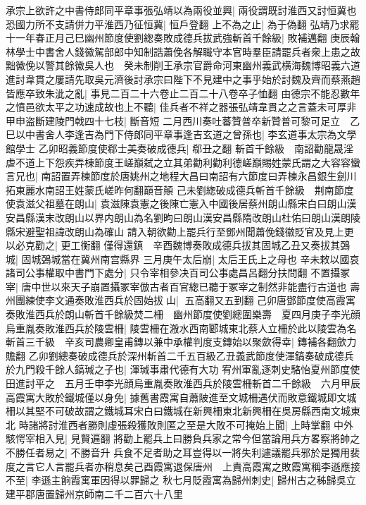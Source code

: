 承宗上欲許之中書侍郎同平章事張弘靖以為兩役並興|{
	兩役謂既討淮西又討恒冀也}
恐國力所不支請併力平淮西乃征恒冀|{
	恒戶登翻}
上不為之止|{
	為于偽翻}
弘靖乃求罷　十一年春正月己巳幽州節度使劉緫奏敗成德兵拔武強斬首千餘級|{
	敗補邁翻}
庚辰翰林學士中書舍人錢徽駕部郎中知制誥蕭俛各解職守本官時羣臣請罷兵者衆上患之故黜徽俛以警其餘徽吳人也　癸未制削王承宗官爵命河東幽州義武横海魏博昭義六道進討韋貫之屢請先取吳元濟後討承宗曰陛下不見建中之事乎始於討魏及齊而蔡燕趙皆應卒致朱泚之亂|{
	事見二百二十六卷止二百二十八卷卒子恤翻}
由德宗不能忍數年之憤邑欲太平之功速成故也上不聽|{
	佳兵者不祥之器張弘靖韋貫之之言蓋未可厚非}
甲申盗斷建陵門戟四十七枝|{
	斷音短}
二月西川奏吐蕃贊普卒新贊普可黎可足立　乙巳以中書舍人李逢吉為門下侍郎同平章事逢吉玄道之曾孫也|{
	李玄道事太宗為文學館學士}
乙卯昭義節度使郗士美奏破成德兵|{
	郗丑之翻}
斬首千餘級　南詔勸龍晟淫虐不道上下怨疾弄棟節度王嵯巔弑之立其弟勸利勸利德嵯巔賜姓蒙氏謂之大容容蠻言兄也|{
	南詔置弄棟節度於唐姚州之地程大昌曰南詔有六節度曰弄棟永昌銀生劍川拓東麗水南詔王姓蒙氏嵯昨何翻巔音顛}
己未劉緫破成德兵斬首千餘級　荆南節度使袁滋父祖墓在朗山|{
	袁滋陳袁憲之後陳亡憲入中國後居蔡州朗山縣宋白曰朗山漢安昌縣漢末改朗山以界内朗山為名劉昫曰朗山漢安昌縣隋改朗山杜佑曰朗山漢朗陵縣宋避聖祖諱改朗山為確山}
請入朝欲勸上罷兵行至鄧州聞蕭俛錢徽貶官及見上更以必克勸之|{
	更工衡翻}
僅得還鎮　辛酉魏博奏敗成德兵拔其固城乙丑又奏拔其鵶城|{
	固城鵶城當在冀州南宫縣界}
三月庚午太后崩|{
	太后王氏上之母也}
辛未敕以國哀諸司公事權取中書門下處分|{
	只令宰相參决百司公事處昌呂翻分扶問翻}
不置攝冢宰|{
	唐中世以來天子崩置攝冢宰倣古者百官緫已聽于冢宰之制然非能盡行古道也}
壽州團練使李文通奏敗淮西兵於固始拔山|{
	五高翻又五到翻}
己卯唐鄧節度使高霞寓奏敗淮西兵於朗山斬首千餘級焚二柵　幽州節度使劉總圍樂壽　夏四月庚子李光顔烏重胤奏敗淮西兵於陵雲柵|{
	陵雲柵在溵水西南郾城東北蔡人立柵於此以陵雲為名}
斬首三千級　辛亥司農卿皇甫鏄以兼中承權判度支鏄始以聚歛得幸|{
	鏄補各翻歛力贍翻}
乙卯劉總奏破成德兵於深州斬首二千五百級乙丑義武節度使渾鎬奏破成德兵於九門殺千餘人鎬瑊之子也|{
	渾瑊事肅代德有大功}
宥州軍亂逐刺史駱怡夏州節度使田進討平之　五月壬申李光顔烏重胤奏敗淮西兵於陵雲柵斬首二千餘級　六月甲辰高霞寓大敗於鐵城僅以身免|{
	據舊書霞寓自蕭陂進至文城柵遇伏而敗意鐵城即文城柵以其堅不可破故謂之鐵城耳宋白曰鐵城在新興柵東北新興柵在吳房縣西南文城東北}
時諸將討淮西者勝則虛張殺獲敗則匿之至是大敗不可掩始上聞|{
	上時掌翻}
中外駭愕宰相入見|{
	見賢遍翻}
將勸上罷兵上曰勝負兵家之常今但當論用兵方畧察將帥之不勝任者易之|{
	不勝音升}
兵食不足者助之耳豈得以一將失利遽議罷兵邪於是獨用裴度之言它人言罷兵者亦稍息矣己酉霞寓退保唐州　上責高霞寓之敗霞寓稱李遜應接不至|{
	李遜主餉霞寓軍因得以罪歸之}
秋七月貶霞寓為歸州刺史|{
	歸州古之秭歸吳立建平郡唐置歸州京師南二千二百六十八里}
